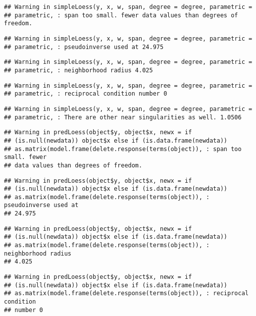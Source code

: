 \documentclass[
]{article}
\begin{document}
\begin{verbatim}
## Warning in simpleLoess(y, x, w, span, degree = degree, parametric =
## parametric, : span too small. fewer data values than degrees of freedom.
\end{verbatim}

\begin{verbatim}
## Warning in simpleLoess(y, x, w, span, degree = degree, parametric =
## parametric, : pseudoinverse used at 24.975
\end{verbatim}

\begin{verbatim}
## Warning in simpleLoess(y, x, w, span, degree = degree, parametric =
## parametric, : neighborhood radius 4.025
\end{verbatim}

\begin{verbatim}
## Warning in simpleLoess(y, x, w, span, degree = degree, parametric =
## parametric, : reciprocal condition number 0
\end{verbatim}

\begin{verbatim}
## Warning in simpleLoess(y, x, w, span, degree = degree, parametric =
## parametric, : There are other near singularities as well. 1.0506
\end{verbatim}

\begin{verbatim}
## Warning in predLoess(object$y, object$x, newx = if
## (is.null(newdata)) object$x else if (is.data.frame(newdata))
## as.matrix(model.frame(delete.response(terms(object)), : span too small. fewer
## data values than degrees of freedom.
\end{verbatim}

\begin{verbatim}
## Warning in predLoess(object$y, object$x, newx = if
## (is.null(newdata)) object$x else if (is.data.frame(newdata))
## as.matrix(model.frame(delete.response(terms(object)), : pseudoinverse used at
## 24.975
\end{verbatim}

\begin{verbatim}
## Warning in predLoess(object$y, object$x, newx = if
## (is.null(newdata)) object$x else if (is.data.frame(newdata))
## as.matrix(model.frame(delete.response(terms(object)), : neighborhood radius
## 4.025
\end{verbatim}

\begin{verbatim}
## Warning in predLoess(object$y, object$x, newx = if
## (is.null(newdata)) object$x else if (is.data.frame(newdata))
## as.matrix(model.frame(delete.response(terms(object)), : reciprocal condition
## number 0
\end{verbatim}
\end{document}
